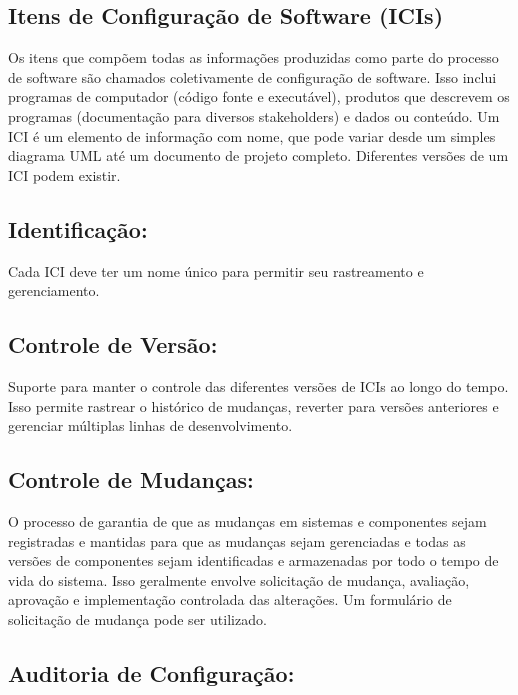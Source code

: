 \documentclass[
]{book}
\begin{document}
\subsection{Itens de Configuração de Software (ICIs)}\label{itens-de-configurauxe7uxe3o-de-software-icis}

Os itens que compõem todas as informações produzidas como parte do processo de software são chamados coletivamente de configuração de software. Isso inclui programas de computador (código fonte e executável), produtos que descrevem os programas (documentação para diversos stakeholders) e dados ou conteúdo. Um ICI é um elemento de informação com nome, que pode variar desde um simples diagrama UML até um documento de projeto completo. Diferentes versões de um ICI podem existir.

\subsection{Identificação:}\label{identificauxe7uxe3o}

Cada ICI deve ter um nome único para permitir seu rastreamento e gerenciamento.

\subsection{Controle de Versão:}\label{controle-de-versuxe3o}

Suporte para manter o controle das diferentes versões de ICIs ao longo do tempo. Isso permite rastrear o histórico de mudanças, reverter para versões anteriores e gerenciar múltiplas linhas de desenvolvimento.

\subsection{Controle de Mudanças:}\label{controle-de-mudanuxe7as}

O processo de garantia de que as mudanças em sistemas e componentes sejam registradas e mantidas para que as mudanças sejam gerenciadas e todas as versões de componentes sejam identificadas e armazenadas por todo o tempo de vida do sistema. Isso geralmente envolve solicitação de mudança, avaliação, aprovação e implementação controlada das alterações. Um formulário de solicitação de mudança pode ser utilizado.

\subsection{Auditoria de Configuração:}\label{auditoria-de-configurauxe7uxe3o}
\end{document}
